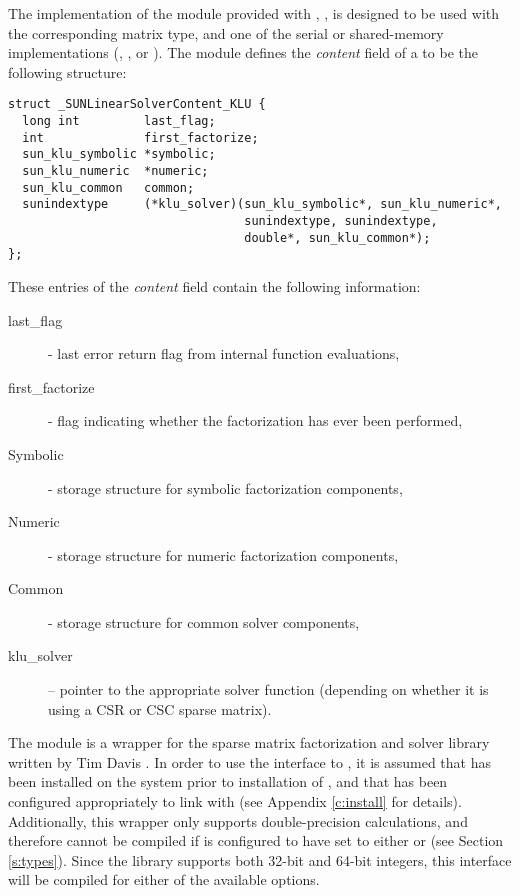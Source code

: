 
The {\klu} implementation of the {\sunlinsol} module provided with
{\sundials}, {\sunlinsolklu}, is designed to be used with the
corresponding {\sunmatsparse} matrix type, and one of the serial or
shared-memory {\nvector} implementations ({\nvecs}, {\nvecopenmp}, or 
{\nvecpthreads}).  The {\sunlinsolklu} module defines the {\em
content} field of a  to be the following structure:
\begin{verbatim} 
struct _SUNLinearSolverContent_KLU {
  long int         last_flag;
  int              first_factorize;
  sun_klu_symbolic *symbolic;
  sun_klu_numeric  *numeric;
  sun_klu_common   common;
  sunindextype     (*klu_solver)(sun_klu_symbolic*, sun_klu_numeric*,
                                 sunindextype, sunindextype,
                                 double*, sun_klu_common*);
};
\end{verbatim}
These entries of the \emph{content} field contain the following
information:
\begin{description}
  \item[last\_flag] - last error return flag from internal function evaluations,
  \item[first\_factorize] - flag indicating whether the factorization
    has ever been performed, 
  \item[Symbolic] - {\klu} storage structure for symbolic factorization components,
  \item[Numeric] - {\klu} storage structure for numeric factorization components,
  \item[Common] - storage structure for common {\klu} solver components,
  \item[klu\_solver] -- pointer to the appropriate {\klu} solver function
    (depending on whether it is using a CSR or CSC sparse matrix).
\end{description}

{\warn} The {\sunlinsolklu} module is a {\sunlinsol} wrapper for
the {\klu} sparse matrix factorization and solver library written by Tim
Davis \cite{KLU_site,DaPa:10}.  In order to use the
{\sunlinsolklu} interface to {\klu}, it is assumed that {\klu} has
been installed on the system prior to installation of {\sundials}, and
that {\sundials} has been configured appropriately to link with {\klu}
(see Appendix \ref{c:install} for details).  Additionally, this
wrapper only supports double-precision calculations, and therefore
cannot be compiled if {\sundials} is configured to have 
set to either  or  (see Section \ref{s:types}).
Since the {\klu} library supports both 32-bit and 64-bit integers, this
interface will be compiled for either of the available  options.

